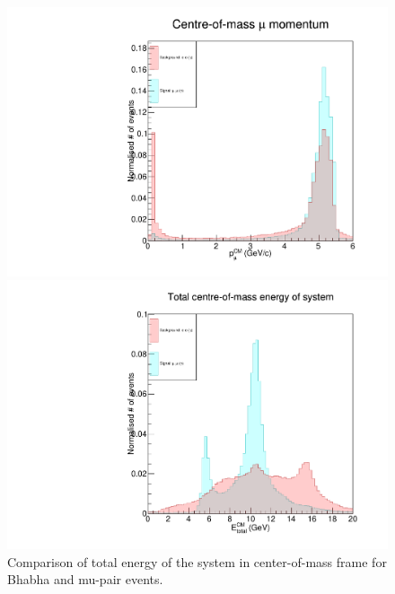 \documentclass[12pt]{thesis}  %
\begin{document}
\begin{figure}[h]
\centering
\begin{minipage}{.475\textwidth}
  \centering
  \includegraphics[width=\linewidth]{images/bhabha-mupair-muCM_P.pdf}
  \caption[]%
  {\small Comparison of center-of-mass frame signal track momentum for Bhabha and mu-pair events.}
  \label{fig:bhabha mupair muCM P}
\end{minipage}%
\hfill
\begin{minipage}{.475\textwidth}
  \centering
  \includegraphics[width=\linewidth]{images/bhabha-mupair-totalCM_E.pdf}
  \caption[]%
  {\small Comparison of total energy of the system in center-of-mass frame for Bhabha and mu-pair events.}
  \label{fig:bhabha mupair EtotalCM}
\end{minipage}
\end{figure}
\end{document}
